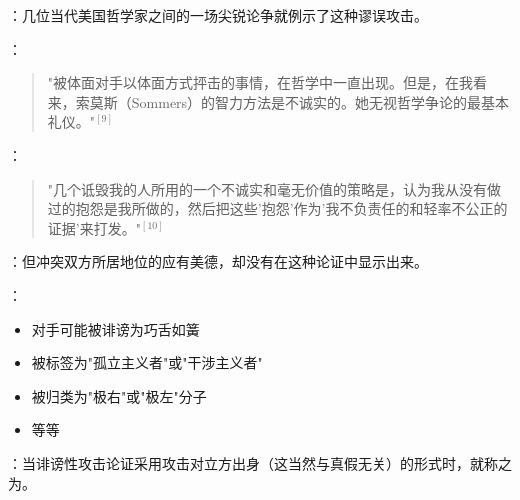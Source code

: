 \begin{examplebox}[title=哲学辩论中的诽谤现象]
：几位当代美国哲学家之间的一场尖锐论争就例示了这种谬误攻击。

：
\begin{quote}
"被体面对手以体面方式抨击的事情，在哲学中一直出现。但是，在我看来，索莫斯（Sommers）的智力方法是不诚实的。她无视哲学争论的最基本礼仪。"$^{[9]}$
\end{quote}

：
\begin{quote}
"几个诋毁我的人所用的一个不诚实和毫无价值的策略是，认为我从没有做过的抱怨是我所做的，然后把这些'抱怨'作为'我不负责任的和轻率不公正的证据'来打发。"$^{[10]}$
\end{quote}

：但冲突双方所居地位的应有美德，却没有在这种论证中显示出来。

：
\begin{itemize}
  \item 对手可能被诽谤为巧舌如簧
  \item 被标签为"孤立主义者"或"干涉主义者"
  \item 被归类为"极右"或"极左"分子
  \item 等等
\end{itemize}

：当诽谤性攻击论证采用攻击对立方出身（这当然与真假无关）的形式时，就称之为。
\end{examplebox}

